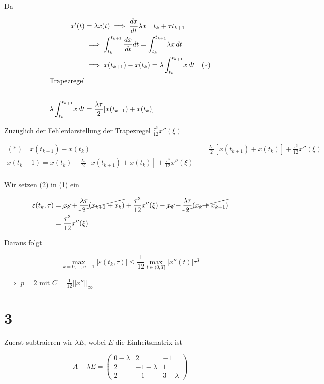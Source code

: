 \documentclass[ngerman,a4paper]{scrartcl}
\begin{document}
Da


\begin{align*}
  x'(t) &= \lambda x(t) \implies \frac{dx}{dt} \lambda x \quad t_k +
  \tau t_{k+1}\\
  &\implies \int^{t_{k+1}}_{t_k} \frac{dx}{dt} dt = \int^{t_{k+1}}_{t_k} \! \lambda x\, dt\\
  &\implies x(t_{k+1}) - x(t_k) = \lambda \int^{t_{k+1}}_{t_k} \! x\, dt \quad (*)\\
  \intertext{Trapezregel}\\
  \lambda \int^{t_{k+1}}_{t_k} \! x\, dt &= \frac{\lambda\tau}{2} [x(t_{k+1}) + x(t_k)]
\end{align*}

Zuzüglich der Fehlerdarstellung der Trapezregel $\frac{\tau^3}{12}x''(\xi)$


\begin{align*}
  (*) \quad x(t_{k+1}) - x(t_k) &= \frac{\lambda\tau}{2}[x(t_{k+1}) +
  x(t_k)] + \frac{\tau^3}{12} x''(\xi)\\
  x(t_k + 1) = x(t_k) + \frac{\lambda\tau}{2} [x(t_{k+1}) +
  x(t_k)] + \frac{\tau^3}{12} x''(\xi)\\
\end{align*}

Wir setzen (2) in (1) ein

\begin{align*}
  \varepsilon(t_k, \tau) &= \cancel{x_k} + \cancel{\frac{\lambda\tau}{2} (x_{k+1} + x_k)}
  + \frac{\tau^3}{12} x''(\xi) - \cancel{x_k} - \cancel{\frac{\lambda\tau}{2} (x_{k} + x_{k+1})}\\
  &= \frac{\tau^3}{12} x''(\xi)
\end{align*}

Daraus folgt

\[
\max_{k=0,\dots,n-1} |\varepsilon(t_k, \tau)| \leq \frac{1}{12} \max_{t \in (0, T]} | x''(t)| \tau^3
\]

$\implies$ $p=2$ mit $C = \frac{1}{12} ||x''||_\infty$

\section*{3}

Zuerst subtraieren wir $\lambda E$, wobei $E$ die Einheitsmatrix ist

\[
A - \lambda E =
\begin{pmatrix}
  0-\lambda & 2 & -1\\
  2 & -1-\lambda & 1\\
  2 & -1 & 3-\lambda
\end{pmatrix}
\]
\end{document}
